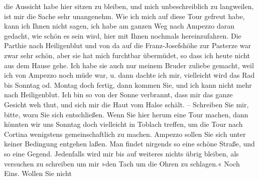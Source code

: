 \begin{ledgroupsized}[t]{13cm}
               die Aussicht habe hier sitzen zu bleiben, und mich unbeschreiblich zu langweilen, ist
               mir die Sache \label{K_L03128-5v}\label{K_L03128-5h} sehr
               unangenehm. Wie ich mich auf diese Tour gefreut habe, kann ich Ihnen nicht sagen, ich
               habe am ganzen Weg nach Ampezzo daran gedacht,
               wie schön es sein wird, hier mit Ihnen nochmals hereinzufahren. Die Parthie nach Heiligenblut und von da auf die Franz-Josefshöhe zur Pasterze war zwar sehr schön, aber sie hat mich furchtbar
               übermüdet, so dass ich heute nicht aus dem Hause gehe.
               Ich habe sie auch nur meinem Bruder zuliebe gemacht, weil ich von Ampezzo noch müde war, u. dann dachte ich mir, vielleicht
               wird das Rad bis Sonntag od. Montag doch fertig, dann kommen Sie, und ich kann nicht mehr nach Heiligenblut. Ich bin so von der Sonne
               verbrannt, dass mir das ganze Gesicht weh thut, und sich mir die Haut vom Halse
               schält. –\pend
           \pstart
           {\pb}Schreiben Sie mir, bitte,
               wozu Sie sich entschließen. Wenn Sie hier herum eine Tour machen, dann könnten wir
               uns Sonntag doch vielleicht in Toblach treffen, um die Tour nach Cortina wenigstens gemeinschaftlich zu machen.\pend
           \pstart
           Ampezzo sollen Sie sich unter keiner Bedingung
               entgehen laßen. Man findet nirgends so eine schöne Straße, und so eine Gegend.\pend
           \pstart
           Jedenfalls wird mir bis auf weiteres nichts übrig bleiben, als versuchen zu
                  schreiben um mir »den Tach um die Ohren zu schlagen.«\pend
           \pstart
           Noch Eins. Wollen Sie nicht \label{K_L03128-6v}
\end{ledgroupsized}
